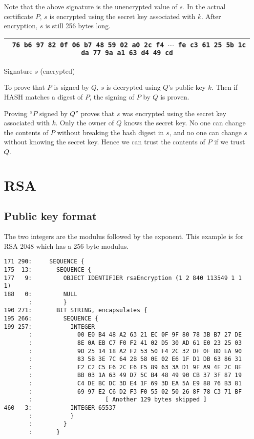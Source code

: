 \documentclass[12pt]{article}
\begin{document}
\bigskip
\noindent
Note that the above signature is the unencrypted value of $s$.
In the actual certificate $P$, $s$ is encrypted using the secret key associated with $k$.
After encryption, $s$ is still 256 bytes long.

\begin{center}
\begin{tabular}{|c|}
\hline
{\footnotesize\tt
76 b6 97 82 0f 06 b7 48 59 02 a0 2c f4 $\cdots$
fe c3 61 25 5b 1c da 77 9a a1 63 d4 49 cd}\\
\hline
\end{tabular}

\medskip
Signature $s$ (encrypted)
\end{center}

\noindent
To prove that $P$ is signed by $Q$, $s$ is decrypted using $Q$'s public key $k$.
Then if HASH matches a digest of $P$, the signing of $P$ by $Q$ is proven.

\bigskip
\noindent
Proving ``$P$ signed by $Q$'' proves that $s$ was encrypted using the secret key associated with $k$.
Only the owner of $Q$ knows the secret key.
No one can change the contents of $P$ without breaking the hash digest in $s$,
and no one can change $s$ without knowing the secret key.
Hence we can trust the contents of $P$ if we trust $Q$.

\newpage
\section{RSA}

\subsection{Public key format}

\noindent
The two integers are the modulus followed by the exponent.
This example is for RSA 2048 which has a 256 byte modulus.

\begin{verbatim}
171 290:     SEQUENCE {
175  13:       SEQUENCE {
177   9:         OBJECT IDENTIFIER rsaEncryption (1 2 840 113549 1 1 1)
188   0:         NULL
       :         }
190 271:       BIT STRING, encapsulates {
195 266:         SEQUENCE {
199 257:           INTEGER
       :             00 E0 B4 48 A2 63 21 EC 0F 9F 80 78 3B B7 27 DE
       :             8E 0A EB C7 F0 F2 41 02 D5 30 AD 61 E0 23 25 03
       :             9D 25 14 18 A2 F2 53 50 F4 2C 32 DF 0F 8D EA 90
       :             83 5B 3E 7C 64 2B 58 0E 02 E6 1F D1 DB 63 86 31
       :             F2 C2 C5 E6 2C E6 F5 89 63 3A D1 9F A9 4E 2C BE
       :             BB 03 1A 63 49 D7 5C B4 48 49 90 CB 37 3F 87 19
       :             C4 DE BC DC 3D E4 1F 69 3D EA 5A E9 88 76 B3 81
       :             69 97 E2 C6 D2 F3 F0 55 02 50 26 8F 78 C3 71 BF
       :                     [ Another 129 bytes skipped ]
460   3:           INTEGER 65537
       :           }
       :         }
       :       }
\end{verbatim}
\end{document}
